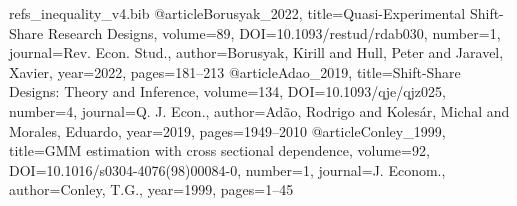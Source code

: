 \begin{filecontents*}[overwrite]{refs_inequality_v4.bib}
@article{Borusyak_2022, title={Quasi-Experimental Shift-Share Research Designs}, volume={89}, DOI={10.1093/restud/rdab030}, number={1}, journal={Rev. Econ. Stud.}, author={Borusyak, Kirill and Hull, Peter and Jaravel, Xavier}, year={2022}, pages={181--213} }
@article{Adao_2019, title={Shift-Share Designs: Theory and Inference}, volume={134}, DOI={10.1093/qje/qjz025}, number={4}, journal={Q. J. Econ.}, author={Ad\~ao, Rodrigo and Koles\'ar, Michal and Morales, Eduardo}, year={2019}, pages={1949--2010} }
@article{Conley_1999, title={{GMM} estimation with cross sectional dependence}, volume={92}, DOI={10.1016/s0304-4076(98)00084-0}, number={1}, journal={J. Econom.}, author={Conley, T.G.}, year={1999}, pages={1--45} }
\end{filecontents*}

\documentclass[review,3p,times,authoryear]{elsarticle}

\usepackage{lineno,hyperref}
\usepackage{amsmath,amssymb}
\usepackage{graphicx}
\usepackage{booktabs}
\usepackage{threeparttable}
\usepackage{multirow}
\usepackage{url}
\usepackage{float}

\providecommand{\DOIprefix}{}\renewcommand{\DOIprefix}{}
\providecommand{\URLprefix}{}\renewcommand{\URLprefix}{}
\providecommand{\doi}[1]{}\renewcommand{\doi}[1]{\href{https://doi.org/#1}{\nolinkurl{https://doi.org/#1}}}

\makeatletter
\long{}
\makeatother
{}

\newcommand{\sym}[1]{\ensuremath{^{#1}}}



